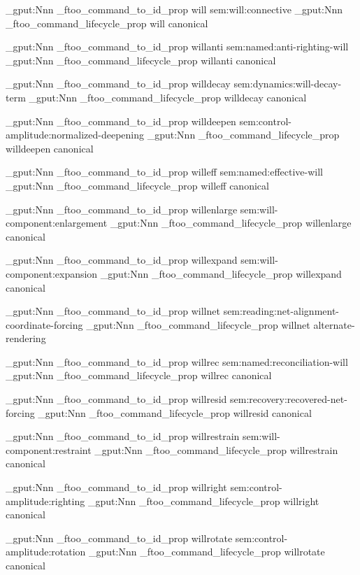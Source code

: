 \prop_gput:Nnn \g_ftoo_command_to_id_prop { will } { sem:will:connective }
\prop_gput:Nnn \g_ftoo_command_lifecycle_prop { will } { canonical }


\prop_gput:Nnn \g_ftoo_command_to_id_prop { willanti } { sem:named:anti-righting-will }
\prop_gput:Nnn \g_ftoo_command_lifecycle_prop { willanti } { canonical }


\prop_gput:Nnn \g_ftoo_command_to_id_prop { willdecay } { sem:dynamics:will-decay-term }
\prop_gput:Nnn \g_ftoo_command_lifecycle_prop { willdecay } { canonical }


\prop_gput:Nnn \g_ftoo_command_to_id_prop { willdeepen } { sem:control-amplitude:normalized-deepening }
\prop_gput:Nnn \g_ftoo_command_lifecycle_prop { willdeepen } { canonical }


\prop_gput:Nnn \g_ftoo_command_to_id_prop { willeff } { sem:named:effective-will }
\prop_gput:Nnn \g_ftoo_command_lifecycle_prop { willeff } { canonical }


\prop_gput:Nnn \g_ftoo_command_to_id_prop { willenlarge } { sem:will-component:enlargement }
\prop_gput:Nnn \g_ftoo_command_lifecycle_prop { willenlarge } { canonical }


\prop_gput:Nnn \g_ftoo_command_to_id_prop { willexpand } { sem:will-component:expansion }
\prop_gput:Nnn \g_ftoo_command_lifecycle_prop { willexpand } { canonical }


\prop_gput:Nnn \g_ftoo_command_to_id_prop { willnet } { sem:reading:net-alignment-coordinate-forcing }
\prop_gput:Nnn \g_ftoo_command_lifecycle_prop { willnet } { alternate-rendering }


\prop_gput:Nnn \g_ftoo_command_to_id_prop { willrec } { sem:named:reconciliation-will }
\prop_gput:Nnn \g_ftoo_command_lifecycle_prop { willrec } { canonical }


\prop_gput:Nnn \g_ftoo_command_to_id_prop { willresid } { sem:recovery:recovered-net-forcing }
\prop_gput:Nnn \g_ftoo_command_lifecycle_prop { willresid } { canonical }


\prop_gput:Nnn \g_ftoo_command_to_id_prop { willrestrain } { sem:will-component:restraint }
\prop_gput:Nnn \g_ftoo_command_lifecycle_prop { willrestrain } { canonical }


\prop_gput:Nnn \g_ftoo_command_to_id_prop { willright } { sem:control-amplitude:righting }
\prop_gput:Nnn \g_ftoo_command_lifecycle_prop { willright } { canonical }


\prop_gput:Nnn \g_ftoo_command_to_id_prop { willrotate } { sem:control-amplitude:rotation }
\prop_gput:Nnn \g_ftoo_command_lifecycle_prop { willrotate } { canonical }


